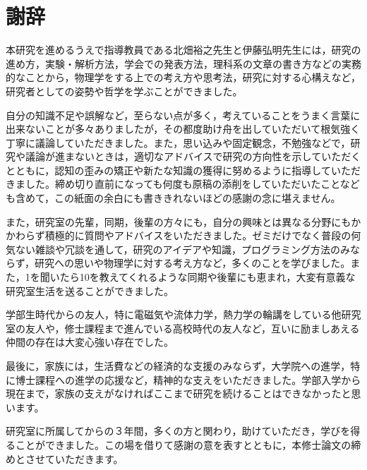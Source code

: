 \documentclass[autodetect-engine,dvi=dvipdfmx,a4paper,ja=standard,oneside,openany,11pt,draft]{bxjsbook}
\begin{document}
\chapter*{謝辞}
本研究を進めるうえで指導教員である北畑裕之先生と伊藤弘明先生には，研究の進め方，実験・解析方法，学会での発表方法，理科系の文章の書き方などの実務的なことから，物理学をする上での考え方や思考法，研究に対する心構えなど，研究者としての姿勢や哲学を学ぶことができました。

自分の知識不足や誤解など，至らない点が多く，考えていることをうまく言葉に出来ないことが多々ありましたが，その都度助け舟を出していただいて根気強く丁寧に議論していただきました。また，思い込みや固定観念，不勉強などで，研究や議論が進まないときは，適切なアドバイスで研究の方向性を示していただくとともに，認知の歪みの矯正や新たな知識の獲得に努めるように指導していただきました。締め切り直前になっても何度も原稿の添削をしていただいたことなども含めて，この紙面の余白にも書ききれないほどの感謝の念に堪えません。

また，研究室の先輩，同期，後輩の方々にも，自分の興味とは異なる分野にもかかわらず積極的に質問やアドバイスをいただきました。ゼミだけでなく普段の何気ない雑談や冗談を通して，研究のアイデアや知識，プログラミング方法のみならず，研究への思いや物理学に対する考え方など，多くのことを学びました。また，1を聞いたら10を教えてくれるような同期や後輩にも恵まれ，大変有意義な研究室生活を送ることができました。

学部生時代からの友人，特に電磁気や流体力学，熱力学の輪講をしている他研究室の友人や，修士課程まで進んでいる高校時代の友人など，互いに励ましあえる仲間の存在は大変心強い存在でした。

最後に，家族には，生活費などの経済的な支援のみならず，大学院への進学，特に博士課程への進学の応援など，精神的な支えをいただきました。学部入学から現在まで，家族の支えがなければここまで研究を続けることはできなかったと思います。

研究室に所属してからの３年間，多くの方と関わり，助けていただき，学びを得ることができました。この場を借りて感謝の意を表すとともに，本修士論文の締めとさせていただきます。


\ifdraft{
  
  
}{}
\end{document}
